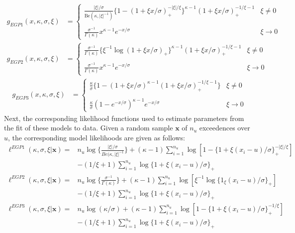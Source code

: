 \documentclass[12pt]{article}
\theoremstyle{definition}
\theoremstyle{definition}
\begin{document}
\begin{align*}
g_{EGP1}(x,\kappa,\sigma,\xi)&=\begin{cases} \frac{|\xi|/\sigma}{\text{Be}(\kappa, |\xi|^{-1})}\{1-(1+\xi x/\sigma)_+^{-|\xi|/\xi}\}^{\kappa-1} (1+\xi x/\sigma)_+^{-1/\xi-1} & \xi \neq 0\\\\
    \frac{\sigma^{-1}}{\Gamma(\kappa)}x^{\kappa-1}e^{-x/\sigma} & \xi \rightarrow 0
    \end{cases}\\
    g_{EGP2}(x,\kappa,\sigma,\xi)&= \begin{cases}\frac{\sigma^{-1}}{\Gamma(\kappa)}\{\xi^{-1}\log(1+\xi x/\sigma)_+\}^{\kappa-1} (1+\xi x/\sigma)_+^{-1/\xi-1} & \xi\neq 0\\\\
    \frac{\sigma^{-1}}{\Gamma(\kappa)}x^{\kappa-1}e^{-x/\sigma} & \xi\rightarrow 0
    \end{cases}
\end{align*}
\begin{align*}
    g_{EGP3}(x,\kappa,\sigma,\xi)&= \begin{cases} \frac{\kappa}{\sigma}\{1-(1+\xi x/\sigma)^{\kappa-1}(1+\xi x/\sigma)_+^{-1/\xi-1}\} & \xi \neq 0\\\\
    \frac{\kappa}{\sigma}(1-e^{-x/\sigma})^{\kappa-1}e^{-x/\sigma} & \xi \rightarrow 0
    \end{cases}
\end{align*}
Next, the corresponding likelihood functions used to estimate parameters from the fit of these models to data. Given a random sample $\boldsymbol x$ of $n_u$ exceedences over $u$, the corresponding model likelihoods are given as follows:
\begin{align*}
    \ell^{EGP1}(\kappa, \sigma,\xi|\boldsymbol{x})=&n_u\log\bigg\{ \frac{|\xi|/\sigma} {Be(\kappa, |\xi|^{-1}}\bigg\}+(\kappa-1)\sum_{i=1}^{n_u}\log[1-\{1+\xi(x_i-u)/\sigma\}_+^{-|\xi|/\xi}]\\
    &-(1/\xi+1)\sum_{i=1}^{n_u}\log\{1+\xi(x_i-u)/\sigma\}_+\\
    \ell^{EGP2}(\kappa, \sigma,\xi|\boldsymbol{x})=&n_u\log\bigg\{ \frac{\sigma^{-1}}{\Gamma(\kappa)}\bigg\}+(\kappa-1)\sum_{i=1}^{n_u}\log[\xi^{-1}\log\{1_\xi(x_i-u)/\sigma\}_+]\\
    &-(1/\xi+1)\sum_{i=1}^{n_u}\log\{1+\xi(x_i-u)/\sigma\}_+\\
    \ell^{EGP3}(\kappa, \sigma,\xi|\boldsymbol{x})=&n_u\log(\kappa/\sigma)+(\kappa-1)\sum_{i=1}^{n_u}\log[1-\{1+\xi(x_i-u)/\sigma\}_+^{-1/\xi}]\\
    &-(1/\xi+1)\sum_{i=1}^{n_u}\log\{1+\xi(x_i-u)/\sigma\}_+
\end{align*}
\end{document}
